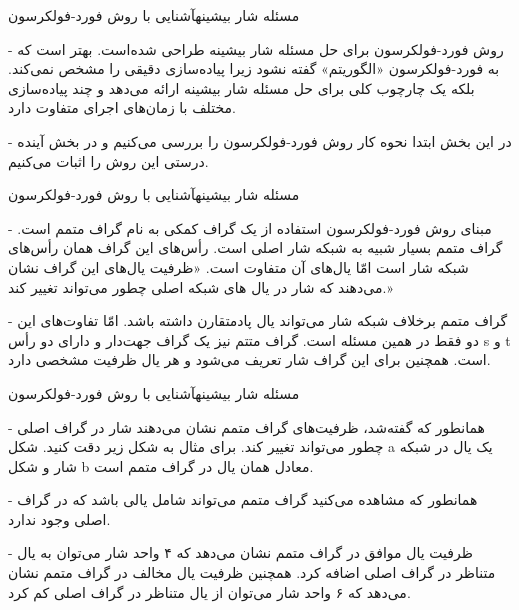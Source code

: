 \begin{itemframe}{مسئله شار بیشینه}{آشنایی با روش فورد-فولکرسون}
\item[-]
روش فورد-فولکرسون
برای حل مسئله شار بیشینه طراحی شده‌است. بهتر است که به فورد-فولکرسون «الگوریتم» گفته نشود زیرا پیاده‌سازی دقیقی را مشخص نمی‌کند. بلکه یک چارچوب کلی برای حل مسئله شار بیشینه ارائه می‌دهد و چند پیاده‌سازی مختلف با زمان‌های اجرای متفاوت دارد.
\item[-]
در این بخش ابتدا نحوه کار روش فورد-فولکرسون را بررسی می‌کنیم و در بخش آینده درستی این روش را اثبات می‌کنیم.
\end{itemframe}

\begin{itemframe}{مسئله شار بیشینه}{آشنایی با روش فورد-فولکرسون}
\item[-]
مبنای روش فورد-فولکرسون استفاده از یک گراف کمکی به نام گراف متمم
 است. گراف متمم بسیار شبیه به شبکه شار اصلی است. رأس‌های این گراف همان رأس‌های شبکه شار است امّا یال‌های آن متفاوت است. «ظرفیت یال‌های این گراف نشان می‌دهند که شار در یال های شبکه اصلی چطور می‌تواند تغییر کند.»
\item[-]
گراف متمم برخلاف شبکه شار می‌تواند یال پادمتقارن داشته باشد. امّا تفاوت‌های این دو فقط در همین مسئله است. گراف متتم نیز یک گراف جهت‌دار و دارای دو رأس s و t است. همچنین برای این گراف شار تعریف می‌شود و هر یال ظرفیت مشخصی دارد.
\end{itemframe}
\begin{itemframe}{مسئله شار بیشینه}{آشنایی با روش فورد-فولکرسون}
\item[-]
همانطور که گفته‌شد، ظرفیت‌های گراف متمم نشان می‌دهند شار در گراف اصلی چطور می‌تواند تغییر کند. برای مثال به شکل زیر دقت کنید. شکل a یک یال در شبکه شار و شکل b معادل همان یال در گراف متمم است.
\item[-]
همانطور که مشاهده می‌کنید گراف متمم می‌تواند شامل یالی باشد که در گراف اصلی وجود ندارد.
\item[-]
ظرفیت یال موافق در گراف متمم نشان می‌دهد که ۴ واحد شار می‌توان به یال متناظر در گراف اصلی اضافه کرد. همچنین ظرفیت یال مخالف در گراف متمم نشان می‌دهد که ۶ واحد شار می‌توان از یال متناظر در گراف اصلی کم کرد.
\end{itemframe}


